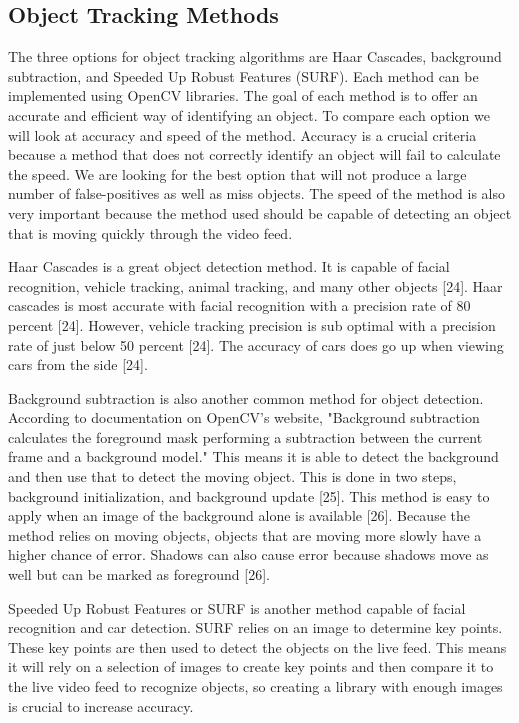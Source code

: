 \documentclass[onecolumn, draftclsnofoot,10pt, compsoc]{IEEEtran}
\begin{document}
\newpage
\subsection{Object Tracking Methods} %

The three options for object tracking algorithms are Haar Cascades, background subtraction, and Speeded Up Robust Features (SURF).
Each method can be implemented using OpenCV libraries.
The goal of each method is to offer an accurate and efficient way of identifying an object.
To compare each option we will look at accuracy and speed of the method.
Accuracy is a crucial criteria because a method that does not correctly identify an object will fail to calculate the speed.
We are looking for the best option that will not produce a large number of false-positives as well as miss objects.
The speed of the method is also very important because the method used should be capable of detecting an object that is moving quickly through the video feed.


Haar Cascades is a great object detection method.
It is capable of facial recognition, vehicle tracking, animal tracking, and many other objects [24].
Haar cascades is most accurate with facial recognition with a precision rate of 80 percent [24].
However, vehicle tracking precision is sub optimal with a precision rate of just below 50 percent [24].
The accuracy of cars does go up when viewing cars from the side [24].

Background subtraction is also another common method for object detection.
According to documentation on OpenCV's website, "Background subtraction calculates the foreground mask performing a subtraction between the current frame and a background model."
This means it is able to detect the background and then use that to detect the moving object.
This is done in two steps, background initialization, and background update [25].
This method is easy to apply when an image of the background alone is available [26].
Because the method relies on moving objects, objects that are moving more slowly have a higher chance of error.
Shadows can also cause error because shadows move as well but can be marked as foreground [26].

Speeded Up Robust Features or SURF is another method capable of facial recognition and car detection.
SURF relies on an image to determine key points.
These key points are then used to detect the objects on the live feed.
This means it will rely on a selection of images to create key points and then compare it to the live video feed to recognize objects, so creating a library with enough images is crucial to increase accuracy.
\end{document}
